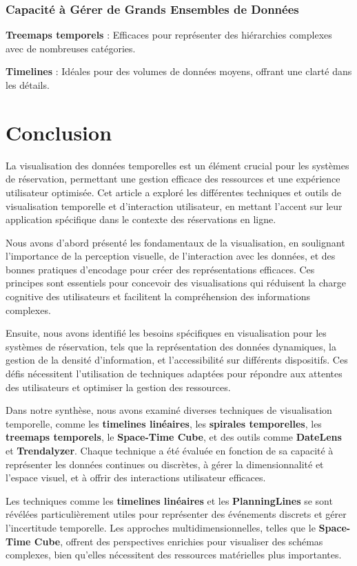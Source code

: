 \documentclass[runningheads]{llncs}
\begin{document}
\subsubsection{Capacité à Gérer de Grands Ensembles de Données}
\textbf{Treemaps temporels} : Efficaces pour représenter des hiérarchies complexes avec de nombreuses catégories.

\textbf{Timelines} : Idéales pour des volumes de données moyens, offrant une clarté dans les détails.

\section{Conclusion}

La visualisation des données temporelles est un élément crucial pour les systèmes de réservation, permettant une gestion efficace des ressources et une expérience utilisateur optimisée. Cet article a exploré les différentes techniques et outils de visualisation temporelle et d'interaction utilisateur, en mettant l'accent sur leur application spécifique dans le contexte des réservations en ligne.

Nous avons d'abord présenté les fondamentaux de la visualisation, en soulignant l'importance de la perception visuelle, de l'interaction avec les données, et des bonnes pratiques d'encodage pour créer des représentations efficaces. Ces principes sont essentiels pour concevoir des visualisations qui réduisent la charge cognitive des utilisateurs et facilitent la compréhension des informations complexes.

Ensuite, nous avons identifié les besoins spécifiques en visualisation pour les systèmes de réservation, tels que la représentation des données dynamiques, la gestion de la densité d'information, et l'accessibilité sur différents dispositifs. Ces défis nécessitent l'utilisation de techniques adaptées pour répondre aux attentes des utilisateurs et optimiser la gestion des ressources.

Dans notre synthèse, nous avons examiné diverses techniques de visualisation temporelle, comme les \textbf{timelines linéaires}, les \textbf{spirales temporelles}, les \textbf{treemaps temporels}, le \textbf{Space-Time Cube}, et des outils comme \textbf{DateLens} et \textbf{Trendalyzer}. Chaque technique a été évaluée en fonction de sa capacité à représenter les données continues ou discrètes, à gérer la dimensionnalité et l'espace visuel, et à offrir des interactions utilisateur efficaces.

Les techniques comme les \textbf{timelines linéaires} et les \textbf{PlanningLines} se sont révélées particulièrement utiles pour représenter des événements discrets et gérer l'incertitude temporelle. Les approches multidimensionnelles, telles que le \textbf{Space-Time Cube}, offrent des perspectives enrichies pour visualiser des schémas complexes, bien qu'elles nécessitent des ressources matérielles plus importantes.
\end{document}
